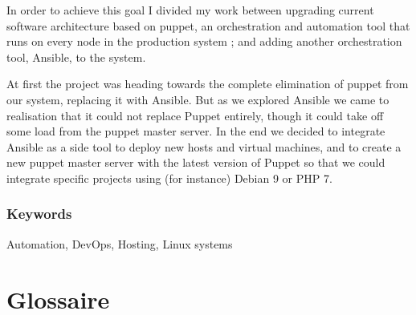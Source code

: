 \documentclass[14 pt]{extreport}
\begin{document}
In order to achieve this goal I divided my work between upgrading current software architecture based on puppet, an orchestration and automation tool that runs on every node in the production system ; and adding another orchestration tool, Ansible, to the system.

At first the project was heading towards the complete elimination of puppet from our system, replacing it with Ansible. But as we explored Ansible we came to realisation that it could not replace Puppet entirely, though it could take off some load from the puppet master server. In the end we decided to integrate Ansible as a side tool to deploy new hosts and virtual machines, and to create a new puppet master server with the latest version of Puppet so that we could integrate specific projects using (for instance) Debian 9 or PHP 7.
\subsection*{Keywords}
Automation, DevOps, Hosting, Linux systems


\chapter*{Glossaire}
\end{document}
